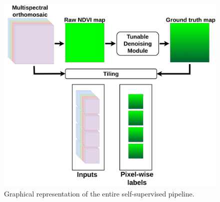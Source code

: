 \documentclass[comsoc,final]{IEEEtran}
\begin{document}
\begin{figure}
    \centering
    \includegraphics[width=0.75\columnwidth]{pipeline1}
    \caption{Graphical representation of the entire self-supervised pipeline.}
    \label{fig:entirepipeline}
\end{figure}%
\end{document}
